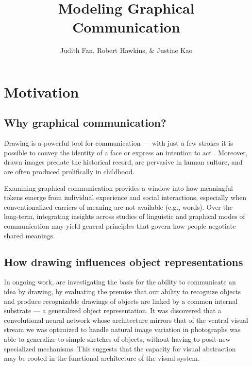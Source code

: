 \documentclass[12pt]{article}
\title{\textbf{Modeling Graphical Communication}}
\author{Judith Fan, Robert Hawkins, \& Justine Kao}
\begin{document}
\maketitle %

\section{Motivation}

\subsection{Why graphical communication?}

Drawing is a powerful tool for communication --- with just a few strokes it is possible to convey the identity of a face \cite{bergmann2013impact} or express an intention to act \cite{Galantucci:2005uh}. Moreover, drawn images predate the historical record, are pervasive in human culture, and are often produced prolifically in childhood.

Examining graphical communication provides a window into how meaningful tokens emerge from individual experience and social interactions, especially when conventionalized carriers of meaning are not available (e.g., words). Over the long-term, integrating insights across studies of linguistic and graphical modes of communication may yield general principles that govern how people negotiate shared meanings.  

\subsection{How drawing influences object representations}

In ongoing work,  are investigating the basis for the ability to communicate an idea by drawing, by evaluating the premise that our ability to recognize objects and produce recognizable drawings of objects are linked by a common internal substrate --- a generalized object representation. It was discovered that a convolutional neural network whose architecture mirrors that of the ventral visual stream we was optimized to handle natural image variation in photographs \cite{Yamins:2014gia} was able to generalize to simple sketches of objects, without having to posit new specialized mechanisms. This suggests that the capacity for visual abstraction may be rooted in the functional architecture of the visual system.
\end{document}
